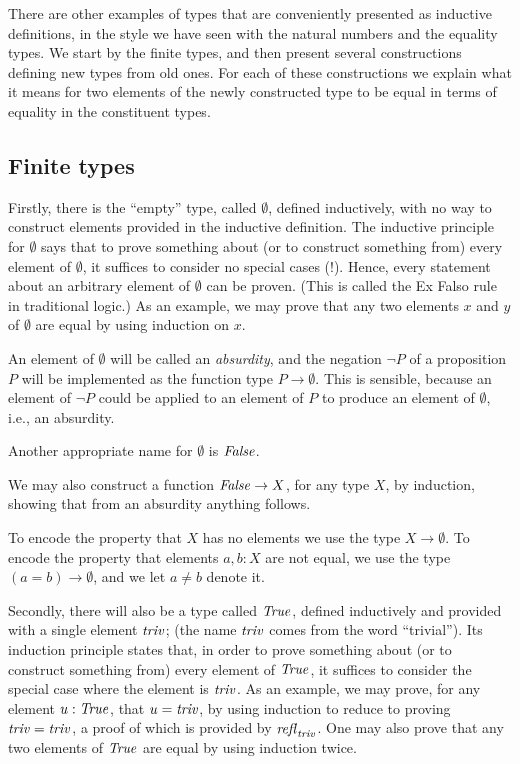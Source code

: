 There are other examples of types that are conveniently presented as inductive definitions, in the style we have seen with the natural numbers
and the equality types.  We start by the finite types, and then
present several constructions defining new types from old ones.
For each of these constructions we explain what it means for two 
elements of the newly constructed type to be equal in terms of
equality in the constituent types.

\subsection{Finite types}
\label{sec:finite-types}
Firstly, there is the ``empty'' type, called $\emptyset$, defined inductively, with no way to construct elements provided in the inductive
definition.  The inductive principle for $\emptyset$ says that to prove something about (or to construct something from) every element of
$\emptyset$, it suffices to consider no special cases (!).  Hence, every statement about an arbitrary element of $\emptyset$ can be proven. (This is called the Ex Falso
rule in traditional logic.) As
an example, we may prove that any two elements $x$ and $y$ of $\emptyset$ are equal by using induction on $x$.

An element of $\emptyset$ will be called an \emph{absurdity}, and the negation $\neg P$ of a proposition $P$ will be implemented as the function
type $P \to \emptyset$.  This is sensible, because an element of $\neg P$ could be applied to an element of $P$ to produce an element of
$\emptyset$, i.e., an absurdity.

Another appropriate name for $\emptyset$ is $\mathop{\mathit{False}}$.

We may also construct a function $\mathop{\mathit{False}} \to X$, for any type $X$, by induction, showing that from an absurdity anything follows.

To encode the property that $X$ has no elements we use the type $X \to \emptyset$.  To encode the property that elements $a,b:X$ are not equal,
we use the type $(a=b) \to \emptyset$, and we let $a \ne b$ denote it.

Secondly, there will also be a type called $\mathop{\mathit{True}}$, defined inductively and provided with a single element $\mathop{\mathit{triv}}$; (the name $\mathop{\mathit{triv}}$ comes from the word
  ``trivial'').  Its induction principle
states that, in order to prove something about (or to construct something from) every element of $\mathop{\mathit{True}}$, it suffices to consider the special
case where the element is $\mathop{\mathit{triv}}$.  As an example, we may prove, for any element $u : \mathop{\mathit{True}}$, that $u=\mathop{\mathit{triv}}$, by using induction to reduce
to proving $\mathop{\mathit{triv}}=\mathop{\mathit{triv}}$, a proof of which is provided by $\mathop{{\it refl}_{\mathop{\mathit{triv}}}}$.  One may also prove that any two elements of $\mathop{\mathit{True}}$ are equal by using induction twice.

